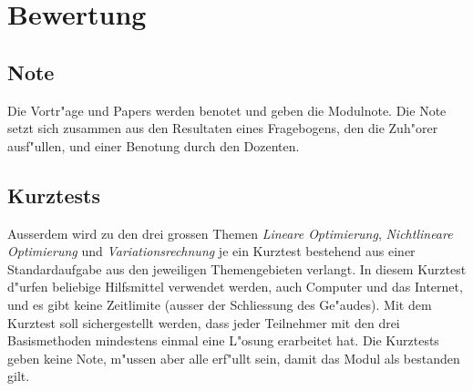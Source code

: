 \documentclass[a4paper,12pt]{article}
\begin{document}
\section{Bewertung}
\subsection{Note}
Die Vortr"age und Papers werden benotet und geben die Modulnote.
Die Note setzt sich zusammen aus den Resultaten eines Fragebogens,
den die Zuh"orer ausf"ullen, und einer Benotung durch den Dozenten.

\subsection{Kurztests}
Ausserdem wird zu den drei grossen Themen {\em Lineare Optimierung},
{\em Nichtlineare Optimierung} und {\em Variationsrechnung} je
ein Kurztest bestehend aus einer Standardaufgabe aus den jeweiligen
Themengebieten verlangt. In diesem Kurztest d"urfen beliebige Hilfsmittel
verwendet werden, auch Computer und das Internet, und es gibt keine
Zeitlimite (ausser der Schliessung des Ge"audes). Mit dem Kurztest
soll sichergestellt werden, dass jeder Teilnehmer mit den drei
Basismethoden mindestens einmal eine L"osung erarbeitet hat.
Die Kurztests geben keine Note, m"ussen aber alle erf"ullt sein,
damit das Modul als bestanden gilt.
\end{document}
